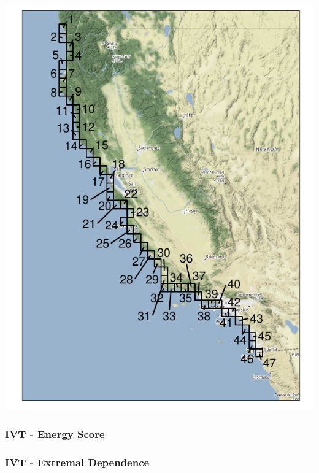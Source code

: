 \documentclass[aspectratio=169,10pt]{beamer}
\newlength{\frametextheight}
\begin{document}
\begin{frame}
\begin{minipage}{.49\textwidth}
        \includegraphics[height=\frametextheight]{./ch1/images/era5_grid}
  \end{minipage}
\end{frame} %

\begin{frame}
  \frametitle{IVT - Energy Score}
  \begin{center}
    
  \end{center}
\end{frame} %

\subsubsection{IVT - Extremal Dependence}
\end{document}
